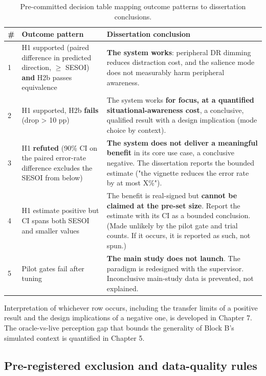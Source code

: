 \begin{longtable}{p{}|p{}|p{}}
\caption{Pre-committed decision table mapping outcome patterns to dissertation conclusions.}\\
\hline
\textbf{\#} & \textbf{Outcome pattern} & \textbf{Dissertation conclusion} \\
\hline
\endhead
\hline
1 & H1 supported (paired difference in predicted direction, $\geq$ SESOI) \textbf{and} H2b passes equivalence & \textbf{The system works}: peripheral DR dimming reduces distraction cost, and the salience mode does not measurably harm peripheral awareness. \\
2 & H1 supported, H2b \textbf{fails} (drop > 10 pp) & The system works \textbf{for focus, at a quantified situational-awareness cost}, a conclusive, qualified result with a design implication (mode choice by context). \\
3 & H1 \textbf{refuted} (90\% CI on the paired error-rate difference excludes the SESOI from below) & \textbf{The system does not deliver a meaningful benefit} in its core use case, a conclusive negative. The dissertation reports the bounded estimate ("the vignette reduces the error rate by at most X\%"). \\
4 & H1 estimate positive but CI spans both SESOI and smaller values & The benefit is real-signed but \textbf{cannot be claimed at the pre-set size}. Report the estimate with its CI as a bounded conclusion. (Made unlikely by the pilot gate and trial counts. If it occurs, it is reported as such, not spun.) \\
5 & Pilot gates fail after tuning & \textbf{The main study does not launch}. The paradigm is redesigned with the supervisor. Inconclusive main-study data is prevented, not explained. \\
\hline
\end{longtable}

Interpretation of whichever row occurs, including the transfer limits of a positive result and the
design implications of a negative one, is developed in Chapter 7. The oracle-vs-live perception gap
that bounds the generality of Block B's simulated context is quantified in Chapter 5.

\subsection{Pre-registered exclusion and data-quality rules}

